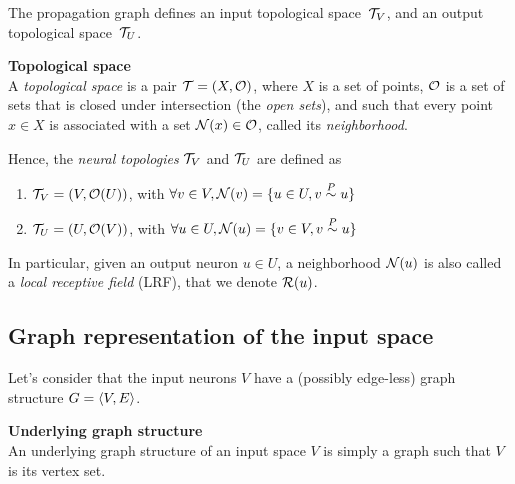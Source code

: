 



The propagation graph defines an input topological space~$\mathcal{T}_V$, and an output topological space~$\mathcal{T}_U$.

\begin{definition}\textbf{Topological space}\\
A \emph{topological space} is a pair $\mathcal{T} = (X, \mathcal{O})$, where $X$ is a set of points, $\mathcal{O}$ is a set of sets that is closed under intersection (the \emph{open sets}), and such that every point $x \in X$ is associated with a set $\mathcal{N}(x) \in \mathcal{O}$, called its \emph{neighborhood}.
\end{definition}

Hence, the \emph{neural topologies} $\mathcal{T}_V$ and $\mathcal{T}_U$ are defined as
\begin{enumerate}
\item $\mathcal{T}_V = (V, \mathcal{O}(U))$, with $\forall v \in V, \mathcal{N}(v) = \{u \in U, v \overset{P}\sim u \}$
\item $\mathcal{T}_U = (U, \mathcal{O}(V))$, with $\forall u \in U, \mathcal{N}(u) = \{v \in V, v \overset{P}\sim u \}$
\end{enumerate}

In particular, given an output neuron $u \in U$, a neighborhood $\mathcal{N}(u)$ is also called a \emph{local receptive field} (LRF), that we denote $\mathcal{R}(u)$.

\subsection{Graph representation of the input space}

Let's consider that the input neurons $V$ have a (possibly edge-less) graph structure $G = \langle V, E \rangle$.

\begin{definition}\textbf{Underlying graph structure}\\
An underlying graph structure of an input space $V$ is simply a graph such that $V$ is its vertex set.
\end{definition}

